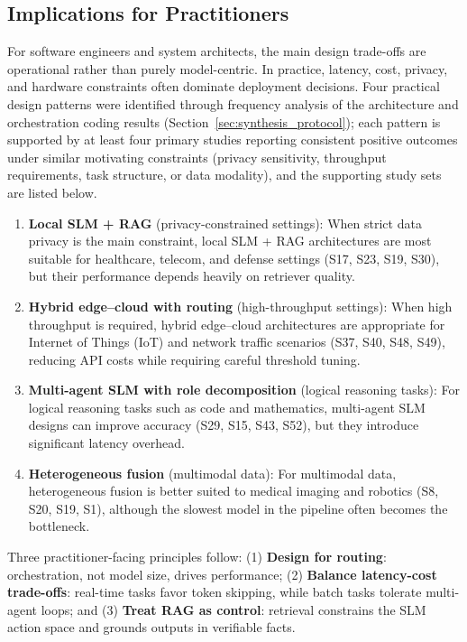\subsection{Implications for Practitioners}
\label{sec:implications}
For software engineers and system architects, the main design trade-offs are operational rather than purely model-centric. In practice, latency, cost, privacy, and hardware constraints often dominate deployment decisions. Four practical design patterns were identified through frequency analysis of the architecture and orchestration coding results (Section~\ref{sec:synthesis_protocol}); each pattern is supported by at least four primary studies reporting consistent positive outcomes under similar motivating constraints (privacy sensitivity, throughput requirements, task structure, or data modality), and the supporting study sets are listed below.

\begin{enumerate}
    \item \textbf{Local SLM + RAG} (privacy-constrained settings): When strict data privacy is the main constraint, local SLM + RAG architectures are most suitable for healthcare, telecom, and defense settings (S17, S23, S19, S30), but their performance depends heavily on retriever quality.
    \item \textbf{Hybrid edge--cloud with routing} (high-throughput settings): When high throughput is required, hybrid edge--cloud architectures are appropriate for Internet of Things (IoT) and network traffic scenarios (S37, S40, S48, S49), reducing API costs while requiring careful threshold tuning.
    \item \textbf{Multi-agent SLM with role decomposition} (logical reasoning tasks): For logical reasoning tasks such as code and mathematics, multi-agent SLM designs can improve accuracy (S29, S15, S43, S52), but they introduce significant latency overhead.
    \item \textbf{Heterogeneous fusion} (multimodal data): For multimodal data, heterogeneous fusion is better suited to medical imaging and robotics (S8, S20, S19, S1), although the slowest model in the pipeline often becomes the bottleneck.
\end{enumerate}

Three practitioner-facing principles follow: (1) \textbf{Design for routing}: orchestration, not model size, drives performance; (2) \textbf{Balance latency-cost trade-offs}: real-time tasks favor token skipping, while batch tasks tolerate multi-agent loops; and (3) \textbf{Treat RAG as control}: retrieval constrains the SLM action space and grounds outputs in verifiable facts.

